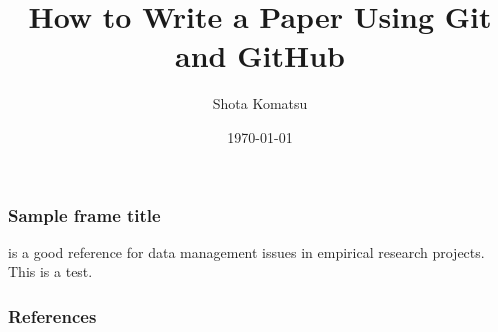 \documentclass{beamer}
\title{How to Write a Paper Using Git and GitHub}
\author{Shota Komatsu}
\date{\today}
\begin{document}
\frame{\titlepage}

\begin{frame}
\frametitle{Sample frame title}
\citet{knittel2018working} is a good reference for data management issues in empirical research projects. This is a test.
\end{frame}

\begin{frame}
\frametitle{References}


    

\end{frame}
\end{document}
